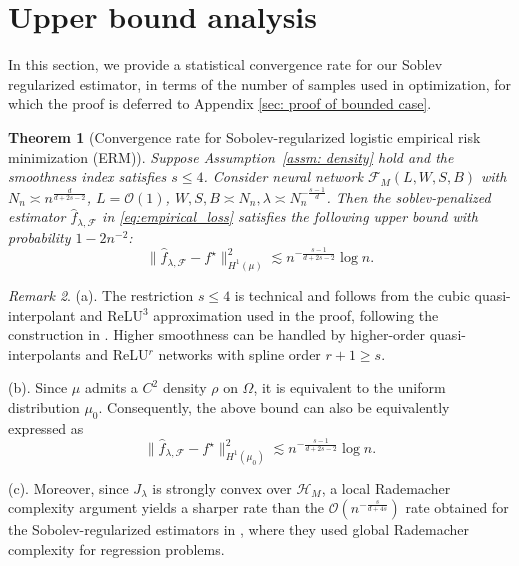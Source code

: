 \documentclass[11pt]{article}
\newcommand{\cF}{\mathcal{F}}
\newcommand{\cH}{\mathcal{H}}
\theoremstyle{plain}
\newtheorem{theorem}{Theorem}[section]
\theoremstyle{definition}
\theoremstyle{remark}
\newtheorem{remark}[theorem]{Remark}
\begin{document}
\section{Upper bound analysis}\label{sec: Theory}

In this section, we provide a statistical convergence rate for our Soblev regularized estimator, in terms of the number of samples used in optimization, for which the proof is deferred to Appendix \ref{sec: proof of bounded case}.


\begin{theorem}[Convergence rate for Sobolev-regularized logistic empirical risk minimization (ERM)]
\label{thm:classification-oracle}
Suppose Assumption~\ref{assm: density} hold and the smoothness index
satisfies \(s\le4\). Consider neural network $\mathcal{F}_M(L, W, S, B)$  with
$N_n\asymp n^{\frac{d}{d+2s-2}}$,
 $L=\mathcal{O}(1)$,
$W,S,B\asymp N_n,
\lambda\asymp N_n^{-\frac{s-1}{d}}$.
Then the soblev-penalized  estimator $\widehat f_{\lambda,\cF}$ in \eqref{eq:empirical_loss} satisfies the following upper bound with probability $1-2n^{-2}$:
\begin{equation*}
     \|\widehat f_{\lambda,\cF}-f^\star\|_{H^1(\mu)}^2 \lesssim n^{-\frac{s-1}{d+2s-2}}\log n.
\end{equation*}
\end{theorem}
\begin{remark}
(a). The restriction \(s\le 4\) is technical and follows from the cubic quasi-interpolant and ReLU\(^3\) approximation used in the proof, following the construction in \cite{lu2021machine}. Higher smoothness can be handled by higher-order quasi-interpolants and ReLU\(^r\) networks with spline order \(r+1\ge s\).
\vspace{5pt}

\noindent  (b). Since $\mu$ admits a $C^2$ density $\rho$  on $\Omega$, it is equivalent to the uniform distribution $\mu_0$. Consequently, the above bound can also be  equivalently expressed as
\begin{equation*}
    \|\widehat f_{\lambda,\cF}-f^\star\|_{H^1(\mu_0)}^2 \lesssim n^{-\frac{s-1}{d+2s-2}}\log n.
\end{equation*}

\noindent (c). Moreover, since $J_\lambda$ is strongly convex over $\cH_M$, a local Rademacher complexity argument yields a sharper rate than the $\mathcal{O}(n^{-\frac{s}{d+4s}})$ rate obtained for the Sobolev-regularized estimators in \cite{ding2025semi}, where they used global Rademacher complexity for regression problems.

\end{remark}
\end{document}
